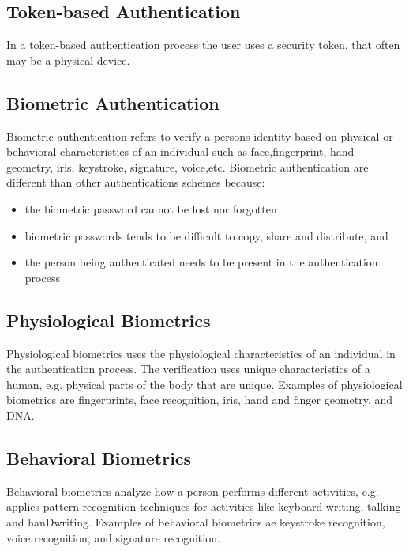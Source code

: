     \subsection{Token-based Authentication}
      In a token-based authentication process the user uses a security token, that often may be a physical device.
      
    \subsection{Biometric Authentication}
      Biometric authentication refers to verify a persons identity based on physical or behavioral characteristics of an individual such as face,fingerprint, hand geometry, iris, keystroke, signature, voice,etc\cite{biometrics, biometrics2}. Biometric authentication are different than other authentications schemes because:

        \begin{itemize}
          \item the biometric password cannot be lost nor forgotten
          \item biometric passwords tends to be difficult to copy, share and distribute, and 
          \item the person being authenticated needs to be present in the authentication process
        \end{itemize} 

      \subsection*{Physiological Biometrics}
        Physiological biometrics uses the physiological characteristics of an individual in the authentication process. The verification uses unique characteristics of a human, e.g. physical parts of the body that are unique. Examples of physiological biometrics are fingerprints, face recognition, iris, hand and finger geometry, and DNA. 

      \subsection*{Behavioral Biometrics}

        Behavioral biometrics analyze how a person performs different activities, e.g. applies pattern recognition techniques for activities like keyboard writing, talking and hanDwriting. Examples of behavioral biometrics ae keystroke recognition, voice recognition, and signature recognition. 

